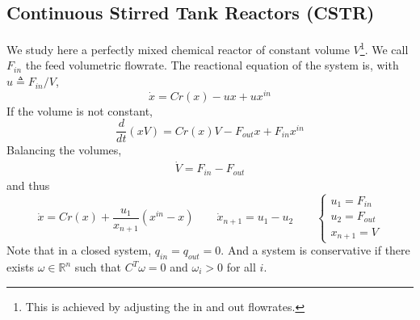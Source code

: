 \documentclass[12pt, openany]{report}
\theoremstyle{definition}
\newcommand{\R}{\mathbb{R}}
\begin{document}
\subsection{Continuous Stirred Tank Reactors (CSTR)}
We study here a perfectly mixed chemical reactor of constant volume $V$\footnote{This is achieved by adjusting the in and out flowrates.}. We call $F_{in}$ the feed volumetric flowrate. The reactional equation of the system is, with $u\triangleq F_{in}/V$,
\begin{equation}
    \dot x = Cr(x)-ux+ux^{in}
\end{equation}
If the volume is not constant,
\begin{equation}
    \frac{d}{dt}(xV) = Cr(x)V-F_{out}x+F_{in}x^{in} 
\end{equation}
Balancing the volumes,
\begin{eqnarray}
    \dot V = F_{in}-F_{out}
\end{eqnarray}
and thus 
\begin{equation}
    \dot x = Cr(x) + \frac{u_1}{x_{n+1}}(x^{in}-x)\qquad \dot x_{n+1} = u_1-u_2 \qquad \begin{cases}
        u_1 = F_{in}\\
        u_2 = F_{out}\\
        x_{n+1} = V
    \end{cases}
\end{equation}
Note that in a closed system, $q_{in}=q_{out}=0$. And a system is conservative if there exists $\omega\in \R^n$ such that $C^T\omega=0$ and $\omega_i>0$ for all $i$.
\end{document}

